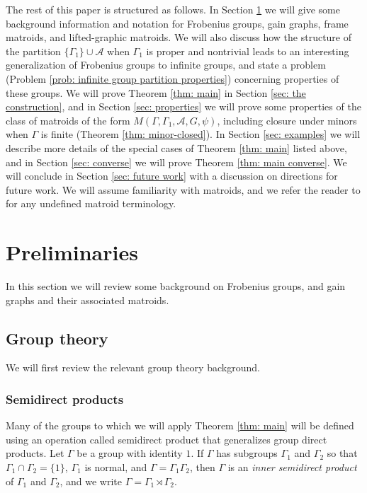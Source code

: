 \documentclass[12pt]{article}
\theoremstyle{definition}
\newcommand{\cA}{\mathcal{A}}
\begin{document}
The rest of this paper is structured as follows.
In Section \ref{sec: preliminaries} we will give some background information and notation for Frobenius groups, gain graphs, frame matroids, and lifted-graphic matroids.
We will also discuss how the structure of the partition $\{\Gamma_1\} \cup \cA$ when $\Gamma_1$ is proper and nontrivial leads to an interesting generalization of Frobenius groups to infinite groups, and state a problem (Problem \ref{prob: infinite group partition properties}) concerning properties of these groups.
We will prove Theorem \ref{thm: main} in Section \ref{sec: the construction}, and in Section \ref{sec: properties} we will prove some properties of the class of matroids of the form $M(\Gamma, \Gamma_1, \cA, G, \psi)$, including closure under minors when $\Gamma$ is finite (Theorem \ref{thm: minor-closed}).
In Section \ref{sec: examples} we will describe more details of the special cases of Theorem \ref{thm: main} listed above, and in Section \ref{sec: converse} we will prove Theorem \ref{thm: main converse}.
We will conclude in Section \ref{sec: future work} with a discussion on directions for future work.
We will assume familiarity with matroids, and we refer the reader to \cite{Oxley2011} for any undefined matroid terminology.





\section{Preliminaries} \label{sec: preliminaries}

In this section we will review some background on Frobenius groups,  and gain graphs and their associated matroids.




\subsection{Group theory} \label{sec: group theory}

We will first review the relevant group theory background.




\subsubsection{Semidirect products}
Many of the groups to which we will apply Theorem \ref{thm: main} will be defined using an operation called semidirect product that generalizes group direct products.
Let $\Gamma$ be a group with identity $1$. 
If $\Gamma$ has subgroups $\Gamma_1$ and $\Gamma_2$ so that $\Gamma_1 \cap \Gamma_2 = \{1\}$, $\Gamma_1$ is normal, and $\Gamma = \Gamma_1\Gamma_2$, then $\Gamma$ is an \emph{inner semidirect product} of $\Gamma_1$ and $\Gamma_2$, and we write $\Gamma = \Gamma_1 \rtimes \Gamma_2$.
\end{document}
